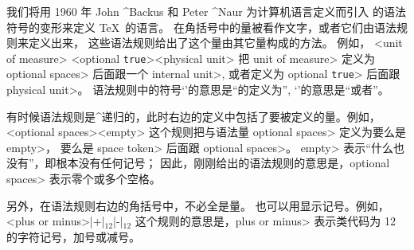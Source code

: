 我们将用 1960 年 John ^{Backus} 和 Peter ^{Naur} 为计算机语言定义而引入%
的语法符号的变形来定义 \TeX\ 的语言。%
在角括号中的量被看作文字，或者它们由{语法规则}来定义出来，
这些语法规则给出了这个量由其它量构成的方法。%
例如，
\beginsyntax
<unit of measure>
  \alt<optional {\tt true}><physical unit>
\endsyntax
把 \<unit of measure> 定义为 \<optional spaces> 后面跟一个 \<internal unit>,
或者定义为 \<optional {\tt true}> 后面跟 \<physical unit>。%
语法规则中的符号`\is'的意思是``的定义为'', `\alt'的意思是``或者''。

有时候语法规则是^{递归的}，此时右边的定义中包括了要被定义的量。例如，
\beginsyntax
<optional spaces>\is<empty>
\endsyntax
这个规则把与语法量 \<optional spaces> 定义为要么是 \<empty>，
要么是 \<space token> 后面跟 \<optional spaces>。
\<empty> 表示``什么也没有''，即根本没有任何记号；
因此，刚刚给出的语法规则的意思是，\<optional spaces> 表示零个或多个空格。

另外，在语法规则右边的角括号中，不必全是量。%
也可以用显示记号。例如，
\beginsyntax
<plus or minus>\is|+|$_{12}$\alt|-|$_{12}$
\endsyntax
这个规则的意思是，\<plus or minus> 表示类代码为 12 的字符记号，加号或减号。

